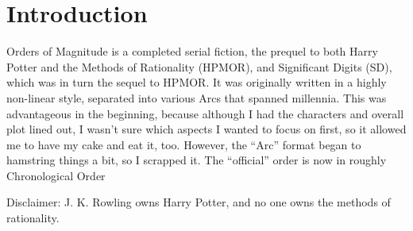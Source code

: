 \chapter{Introduction}

Orders of Magnitude is a completed serial fiction, the prequel to both Harry Potter
and the Methods of Rationality (HPMOR), and Significant Digits (SD), which was in
turn the sequel to HPMOR. It was originally written in a highly non-linear style,
separated into various Arcs that spanned millennia. This was advantageous in the
beginning, because although I had the characters and overall plot lined out, I wasn’t
sure which aspects I wanted to focus on first, so it allowed me to have my cake and
eat it, too. However, the “Arc” format began to hamstring things a bit, so I scrapped
it. The “official” order is now in roughly Chronological Order
\vspace*{0.5cm}\par
Disclaimer: J. K. Rowling owns Harry Potter, and no one owns the methods of
rationality.
